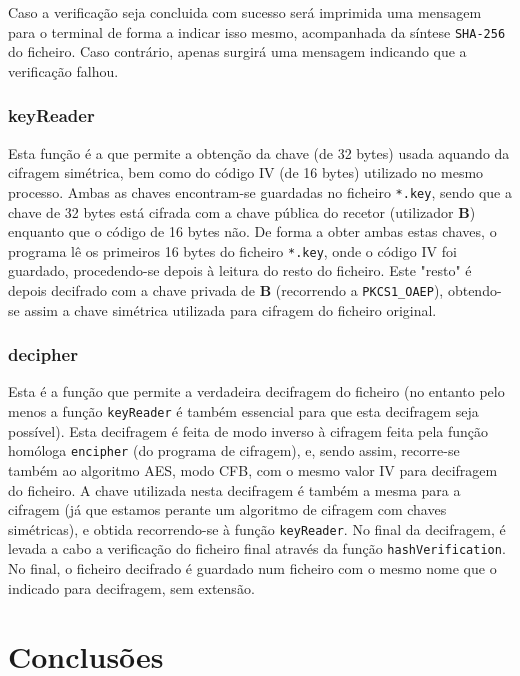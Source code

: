 \documentclass[a4paper,11pt,openright,oneside]{report}
\begin{document}
Caso a verificação seja concluida com sucesso será imprimida uma mensagem para o terminal de forma a indicar isso mesmo, acompanhada da síntese \verb|SHA-256| do ficheiro. Caso contrário, apenas surgirá uma mensagem indicando que a verificação falhou.

\subsection{keyReader}

Esta função é a que permite a obtenção da chave (de 32 bytes) usada aquando da cifragem simétrica, bem como do código IV (de 16 bytes) utilizado no mesmo processo. Ambas as chaves encontram-se guardadas no ficheiro \verb|*.key|, sendo que a chave de 32 bytes está cifrada com a chave pública do recetor (utilizador \textbf{B}) enquanto que o código de 16 bytes não. De forma a obter ambas estas chaves, o programa lê os primeiros 16 bytes do ficheiro \verb|*.key|, onde o código IV foi guardado, procedendo-se depois à leitura do resto do ficheiro. Este "resto" é depois decifrado com a chave privada de \textbf{B} (recorrendo a \verb|PKCS1_OAEP|), obtendo-se assim a chave simétrica utilizada para cifragem do ficheiro original.

\subsection{decipher}

Esta é a função que permite a verdadeira decifragem do ficheiro (no entanto pelo menos a função \verb|keyReader| é também essencial para que esta decifragem seja possível). Esta decifragem é feita de modo inverso à cifragem feita pela função homóloga \verb|encipher| (do programa de cifragem), e, sendo assim, recorre-se também ao algoritmo AES, modo CFB, com o mesmo valor IV para decifragem do ficheiro. A chave utilizada nesta decifragem é também a mesma para a cifragem (já que estamos perante um algoritmo de cifragem com chaves simétricas), e obtida recorrendo-se à função \verb|keyReader|. No final da decifragem, é levada a cabo a verificação do ficheiro final através da função \verb|hashVerification|.\\

No final, o ficheiro decifrado é guardado num ficheiro com o mesmo nome que o indicado para decifragem, sem extensão.

\chapter{Conclusões}
\label{chap.conclusões}
\end{document}
